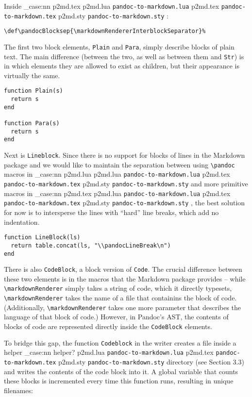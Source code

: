 \documentclass[
  digital,     %
  oneside,     %
  nosansbold,  %
  nocolorbold, %
  lof,         %
  nolot,       %
]{fithesis4}
\newcommand\macro[1]{\texttt{\textbackslash{}{#1}}}
\newcommand\pandoc[1]{\macro{pandoc\-{#1}}}
\newcommand\renderer[1]{\macro{markdown\-Renderer\-{#1}}}
\newcommand\file[1]
  {
    \str_case:nn
      { #1 }
      {
        { p2md.lua } { \texttt{pandoc\hyp{}to\hyp{}markdown.lua} }
        { p2md.tex } { \texttt{pandoc\hyp{}to\hyp{}markdown.tex} }
        { p2md.sty } { \texttt{pandoc\hyp{}to\hyp{}markdown.sty} }
      }
  }
\begin{document}
\noindent
Inside \file{p2md.tex}:

\noindent
\lstset{language=[plain]TeX}
\begin{lstlisting}
\def\pandocBlocksep{\markdownRendererInterblockSeparator}%
\end{lstlisting}

\noindent
The first two block elements, \texttt{Plain} and \texttt{Para}, simply describe blocks of plain text. The main difference (between the two, as well as between them and \texttt{Str}) is in which elements they are allowed to exist as children, but their appearance is virtually the same.

\noindent
\lstset{language=[5.3]Lua}
\begin{lstlisting}
function Plain(s)
  return s
end

function Para(s)
  return s
end
\end{lstlisting}

\noindent
Next is \texttt{Lineblock}. Since there is no support for blocks of lines in the Markdown package and we would like to maintain the separation between using \pandoc{...} macros in \file{p2md.lua} and more primitive macros in \file{p2md.tex}, the best solution for now is to intersperse the lines with ``hard'' line breaks, which add no indentation.

\noindent
\lstset{language=[5.3]Lua}
\begin{lstlisting}
function LineBlock(ls)
  return table.concat(ls, "\\pandocLineBreak\n")
end
\end{lstlisting}

\noindent
There is also \texttt{CodeBlock}, a block version of \texttt{Code}. The crucial difference between these two elements is in the macros that the Markdown package provides -- while \renderer{CodeSpan} simply takes a string of code, which it directly typesets, \renderer{Verbatim} takes the name of a file that containins the block of code. (Additionally, \renderer{FencedCode} takes one more parameter that describes the language of that block of code.) However, in Pandoc's AST, the contents of blocks of code are represented directly inside the \texttt{CodeBlock} elements.

To bridge this gap, the function \texttt{Codeblock} in the writer creates a file inside a helper\file{helper?} directory (see Section 3.3) and writes the contents of the code block into it. A global variable that counts these blocks is incremented every time this function runs, resulting in unique filenames:
\end{document}
